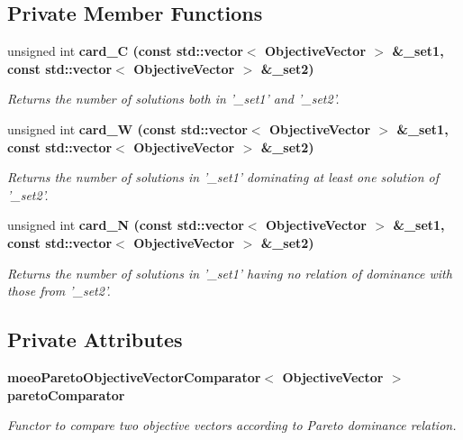 \subsection*{Private Member Functions}
\begin{CompactItemize}
\item 
unsigned int \bf{card\_\-C} (const std::vector$<$ \bf{Objective\-Vector} $>$ \&\_\-set1, const std::vector$<$ \bf{Objective\-Vector} $>$ \&\_\-set2)
\begin{CompactList}\small\item\em Returns the number of solutions both in '\_\-set1' and '\_\-set2'. \item\end{CompactList}\item 
unsigned int \bf{card\_\-W} (const std::vector$<$ \bf{Objective\-Vector} $>$ \&\_\-set1, const std::vector$<$ \bf{Objective\-Vector} $>$ \&\_\-set2)
\begin{CompactList}\small\item\em Returns the number of solutions in '\_\-set1' dominating at least one solution of '\_\-set2'. \item\end{CompactList}\item 
unsigned int \bf{card\_\-N} (const std::vector$<$ \bf{Objective\-Vector} $>$ \&\_\-set1, const std::vector$<$ \bf{Objective\-Vector} $>$ \&\_\-set2)
\begin{CompactList}\small\item\em Returns the number of solutions in '\_\-set1' having no relation of dominance with those from '\_\-set2'. \item\end{CompactList}\end{CompactItemize}
\subsection*{Private Attributes}
\begin{CompactItemize}
\item 
\bf{moeo\-Pareto\-Objective\-Vector\-Comparator}$<$ \bf{Objective\-Vector} $>$ \bf{pareto\-Comparator}\label{classmoeoContributionMetric_b474229c85ffbf5108f51eef01ab2d64}

\begin{CompactList}\small\item\em Functor to compare two objective vectors according to Pareto dominance relation. \item\end{CompactList}\end{CompactItemize}


